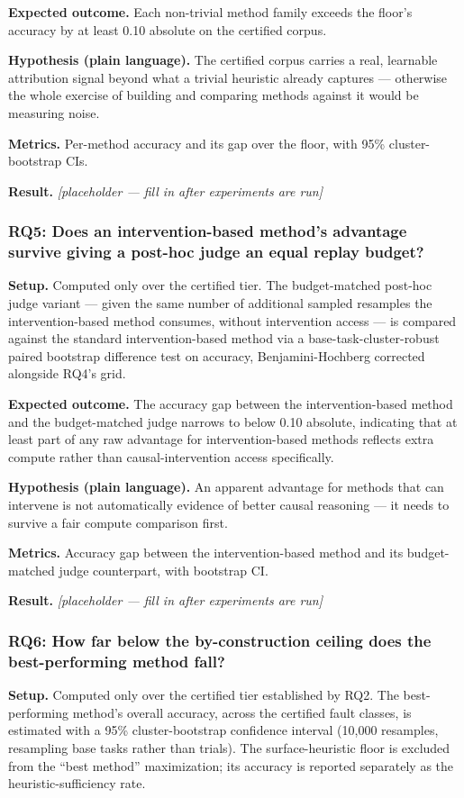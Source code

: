 \documentclass[11pt]{article}
\newcommand{\ph}{\textit{[placeholder --- fill in after experiments are run]}}
\begin{document}
\textbf{Expected outcome.} Each non-trivial method family exceeds the floor's accuracy by at least 0.10 absolute on the certified corpus.

\textbf{Hypothesis (plain language).} The certified corpus carries a real, learnable attribution signal beyond what a trivial heuristic already captures --- otherwise the whole exercise of building and comparing methods against it would be measuring noise.

\textbf{Metrics.} Per-method accuracy and its gap over the floor, with 95\% cluster-bootstrap CIs.

\textbf{Result.} \ph

\subsubsection{RQ5: Does an intervention-based method's advantage survive giving a post-hoc judge an equal replay budget?}
\textbf{Setup.} Computed only over the certified tier. The budget-matched post-hoc judge variant --- given the same number of additional sampled resamples the intervention-based method consumes, without intervention access --- is compared against the standard intervention-based method via a base-task-cluster-robust paired bootstrap difference test on accuracy, Benjamini-Hochberg corrected alongside RQ4's grid.

\textbf{Expected outcome.} The accuracy gap between the intervention-based method and the budget-matched judge narrows to below 0.10 absolute, indicating that at least part of any raw advantage for intervention-based methods reflects extra compute rather than causal-intervention access specifically.

\textbf{Hypothesis (plain language).} An apparent advantage for methods that can intervene is not automatically evidence of better causal reasoning --- it needs to survive a fair compute comparison first.

\textbf{Metrics.} Accuracy gap between the intervention-based method and its budget-matched judge counterpart, with bootstrap CI.

\textbf{Result.} \ph

\subsubsection{RQ6: How far below the by-construction ceiling does the best-performing method fall?}
\textbf{Setup.} Computed only over the certified tier established by RQ2. The best-performing method's overall accuracy, across the certified fault classes, is estimated with a 95\% cluster-bootstrap confidence interval (10,000 resamples, resampling base tasks rather than trials). The surface-heuristic floor is excluded from the ``best method'' maximization; its accuracy is reported separately as the heuristic-sufficiency rate.
\end{document}
